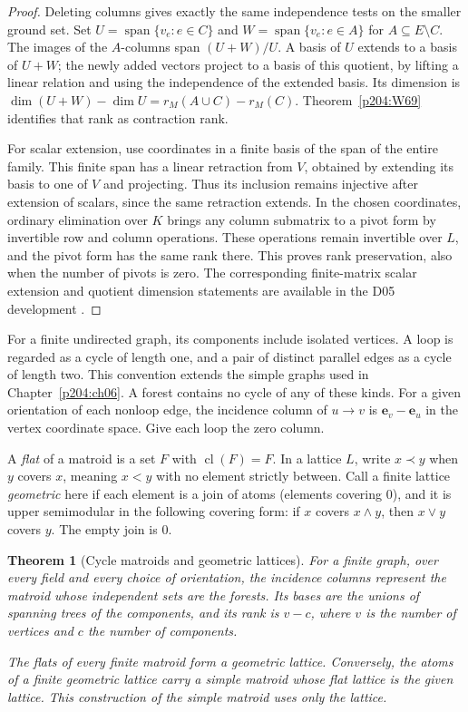 \documentclass[11pt,oneside,openany]{book}
\theoremstyle{plain}
\newtheorem{theorem}{Theorem}[chapter]
\theoremstyle{definition}
\theoremstyle{remark}
\begin{document}
\begin{proof}
Deleting columns gives exactly the same independence tests
on the smaller ground set. Set \(U=\operatorname{span}\{v_e:e\in
C\}\) and \(W=\operatorname{span}\{v_e:e\in A\}\) for
\(A\subseteq E\setminus C\). The images of the \(A\)-columns
span \((U+W)/U\). A basis of \(U\) extends to a basis of
\(U+W\); the newly added vectors project to a basis of this
quotient, by lifting a linear relation and using the
independence of the extended basis. Its dimension is
\(\dim(U+W)-\dim U=r_M(A\cup C)-r_M(C)\).
Theorem~\ref{p204:W69} identifies that rank as contraction rank.

For scalar extension, use coordinates in a finite basis of the
span of the entire family. This finite span has a linear
retraction from \(V\), obtained by extending its basis to one of
\(V\) and projecting. Thus its inclusion remains injective after
extension of scalars, since the same retraction extends. In the
chosen coordinates, ordinary elimination over \(K\) brings any
column submatrix to a pivot form by invertible row and column
operations. These operations remain invertible over \(L\),
and the pivot form has the same rank there. This proves rank
preservation, also when the number of pivots is zero.
The corresponding finite-matrix scalar extension and quotient
dimension statements are available in the D05 development
\cite{D05}.
\end{proof}

For a finite undirected graph, its components include isolated
vertices. A loop is regarded as a cycle of length one, and a pair
of distinct parallel edges as a cycle of length two. This
convention extends the simple graphs used in Chapter~\ref{p204:ch06}.
A forest contains no cycle of any of these kinds. For a given
orientation of each nonloop edge, the incidence column of
\(u\longrightarrow v\) is \(\mathbf e_v-\mathbf e_u\) in the
vertex coordinate space. Give each loop the zero column.

A \emph{flat} of a matroid is a set \(F\) with
\(\operatorname{cl}(F)=F\). In a lattice \(L\), write \(x\prec y\)
when \(y\) covers \(x\), meaning \(x<y\) with no element
strictly between. Call a finite lattice \emph{geometric} here
if each element is a join of atoms (elements covering \(0\)),
and it is upper semimodular in the following covering form:
if \(x\) covers \(x\wedge y\), then \(x\vee y\) covers \(y\).
The empty join is \(0\).

\begin{theorem}[Cycle matroids and geometric lattices]
\label{p204:W72}
For a finite graph, over every field and every choice of
orientation, the incidence columns represent the matroid
whose independent sets are the forests. Its bases are the
unions of spanning trees of the components, and its rank is
\(v-c\), where \(v\) is the number of vertices and \(c\) the
number of components.

The flats of every finite matroid form a geometric lattice.
Conversely, the atoms of a finite geometric lattice carry a
simple matroid whose flat lattice is the given lattice.
This construction of the simple matroid uses only the lattice.
\end{theorem}
\end{document}
